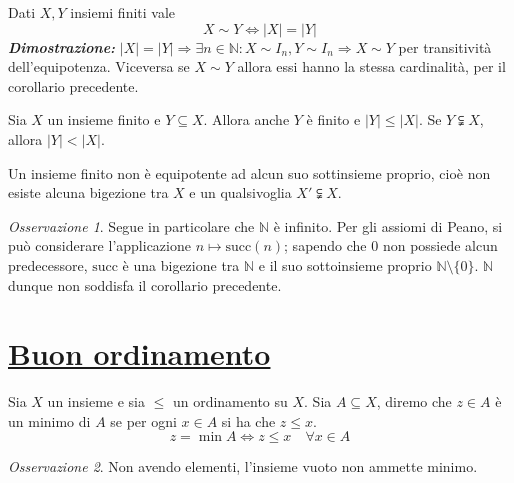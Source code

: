 \documentclass[oneside]{book}
\theoremstyle{remark}
\newtheorem*{osservaz}{Osservazione}
\begin{document}
\begin{tcolorbox}[title={Condizione di equipotenza espressa in termini di cardinalità}]
Dati $X,Y$ insiemi finiti vale
\[ X\sim Y \Longleftrightarrow |X|=|Y| \]
\textit{\textbf{Dimostrazione:}} $|X|=|Y|\Longrightarrow \exists n\in\mathbb{N}:
X\sim I_n, Y\sim I_n\Longrightarrow X\sim Y$ per transitività dell'equipotenza.
Viceversa se $X\sim Y$ allora essi hanno la stessa cardinalità, per il
corollario precedente.
\end{tcolorbox}

\begin{tcolorbox}[title={Cardinalità di sottoinsiemi finiti}]
Sia $X$ un insieme finito e $Y\subseteq X$. Allora anche
$Y$ è finito e $|Y|\leq|X|$. Se $Y\subsetneqq X$, allora
$|Y|<|X|$.
\end{tcolorbox}

\begin{tcolorbox}[colback=green!30, colframe=green!30!black, title={Equipotenza tra insieme finito e sottoinsieme}]
Un insieme finito non è equipotente ad alcun suo sottinsieme proprio,
cioè non esiste alcuna bigezione tra $X$ e un qualsivoglia $X'\subsetneqq X$.
\end{tcolorbox}

\begin{osservaz}
Segue in particolare che $\mathbb{N}$ è
infinito. Per gli assiomi di Peano, si può considerare
l'applicazione $n\mapsto \text{succ}(n)$; sapendo che 0 non
possiede alcun predecessore, $\text{succ}$ è una bigezione
tra $\mathbb{N}$ e il suo sottoinsieme proprio $\mathbb{N}\setminus\{0\}$.
$\mathbb{N}$ dunque non soddisfa il corollario precedente.
\end{osservaz}





\section{\underline{Buon ordinamento}}
\begin{tcolorbox}[colback=yellow!30, colframe=yellow!30!black, title=Minimo]
Sia $X$ un insieme e sia $\leq$ un ordinamento su $X$. Sia $A \subseteq X$, diremo
che $z \in A$ è un minimo di $A$ se per ogni $x \in A$ si ha che $z \leq x$.
\[ z = \min A \Longleftrightarrow z \leq x \quad \forall x \in A \]
\end{tcolorbox}

\begin{osservaz}
Non avendo elementi, l'insieme vuoto non ammette minimo.
\end{osservaz}
\end{document}
